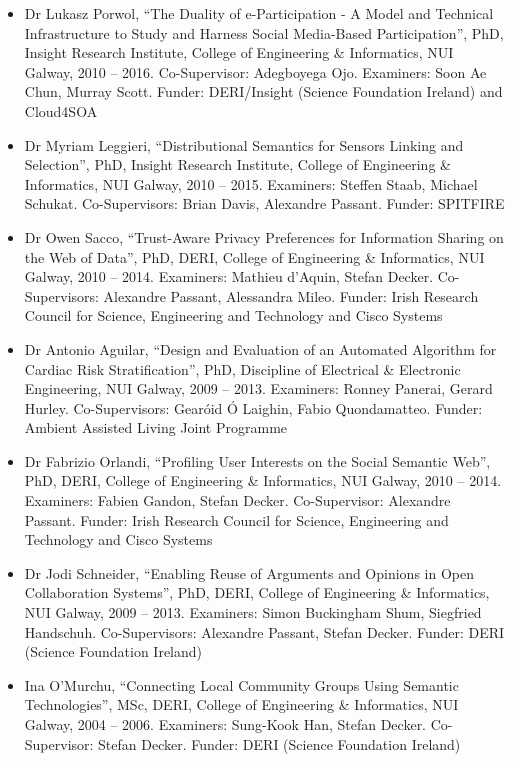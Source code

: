 \documentclass[10pt,a4paper]{res} %
\begin{document}
\begin{resume}
\begin{itemize}
\item Dr Lukasz Porwol, ``The Duality of e-Participation - A Model and Technical Infrastructure to Study and Harness Social Media-Based Participation'', PhD, Insight Research Institute, College of Engineering \& Informatics, NUI Galway, 2010 -- 2016. Co-Supervisor: Adegboyega Ojo. Examiners: Soon Ae Chun, Murray Scott. Funder: DERI/Insight (Science Foundation Ireland) and Cloud4SOA
\item Dr Myriam Leggieri, ``Distributional Semantics for Sensors Linking and Selection'', PhD, Insight Research Institute, College of Engineering \& Informatics, NUI Galway, 2010 -- 2015. Examiners: Steffen Staab, Michael Schukat. Co-Supervisors: Brian Davis, Alexandre Passant. Funder: SPITFIRE %
\item Dr Owen Sacco, ``Trust-Aware Privacy Preferences for Information Sharing on the Web of Data'', PhD, DERI, College of Engineering \& Informatics, NUI Galway, 2010 -- 2014. Examiners: Mathieu d'Aquin, Stefan Decker. Co-Supervisors: Alexandre Passant, Alessandra Mileo. Funder: Irish Research Council for Science, Engineering and Technology and Cisco Systems %
\item Dr Antonio Aguilar, ``Design and Evaluation of an Automated Algorithm for Cardiac Risk Stratification'', PhD, Discipline of Electrical \& Electronic Engineering, NUI Galway, 2009 -- 2013. Examiners: Ronney Panerai, Gerard Hurley. Co-Supervisors: Gear\'{o}id \'{O} Laighin, Fabio Quondamatteo. Funder: Ambient Assisted Living Joint Programme %
\item Dr Fabrizio Orlandi, ``Profiling User Interests on the Social Semantic Web'', PhD, DERI, College of Engineering \& Informatics, NUI Galway, 2010 -- 2014. Examiners: Fabien Gandon, Stefan Decker. Co-Supervisor: Alexandre Passant. Funder: Irish Research Council for Science, Engineering and Technology and Cisco Systems %
\item Dr Jodi Schneider, ``Enabling Reuse of Arguments and Opinions in Open Collaboration Systems'', PhD, DERI, College of Engineering \& Informatics, NUI Galway, 2009 -- 2013. Examiners: Simon Buckingham Shum, Siegfried Handschuh. Co-Supervisors: Alexandre Passant, Stefan Decker. Funder: DERI (Science Foundation Ireland) %
\item Ina O'Murchu, ``Connecting Local Community Groups Using Semantic Technologies'', MSc, DERI, College of Engineering \& Informatics, NUI Galway, 2004 -- 2006. Examiners: Sung-Kook Han, Stefan Decker. Co-Supervisor: Stefan Decker. Funder: DERI (Science Foundation Ireland)
\end{itemize}


\end{resume}
\end{document}
